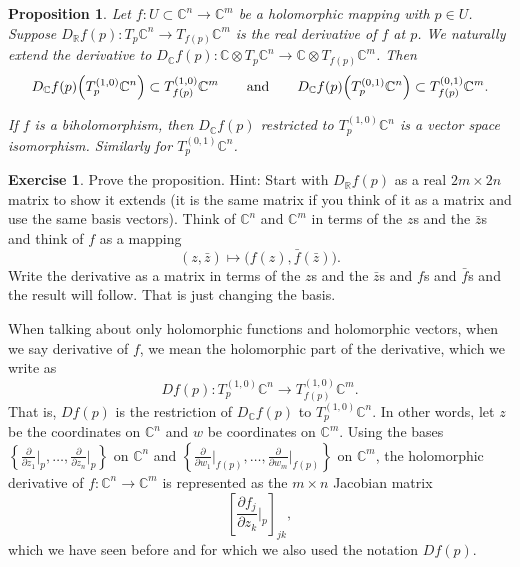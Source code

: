 \documentclass[12pt,openany]{book}
\newcommand{\C}{{\mathbb{C}}}
\newcommand{\R}{{\mathbb{R}}}
\theoremstyle{plain}
\newtheorem{prop}[thm]{Proposition}
\theoremstyle{remark}
\theoremstyle{definition}
\newenvironment{exbox}{%
    \def\FrameCommand{\vrule width 1pt \relax\hspace {10pt}}%
    \MakeFramed {\advance \hsize -\width \FrameRestore }%
}{%
    \endMakeFramed
}
\theoremstyle{exercise}
\newtheorem{exercise}{Exercise}[section]
\theoremstyle{example}
\begin{document}
\begin{prop} \label{prop:holvectmap}
Let $f \colon U \subset \C^n \to \C^m$ be a holomorphic mapping with
$p \in U$.
Suppose 
$D_\R f(p) \colon T_p\C^n \to T_{f(p)} \C^m$
is the real derivative of $f$ at $p$.
%
We naturally
extend the derivative to $D_\C f(p) \colon \C \otimes T_p\C^n \to \C \otimes  T_{f(p)}
\C^m$.  Then
\begin{equation*}
D_\C f(p)\Bigl(T_p^{(1,0)} \C^n\Bigr) \subset T_{f(p)}^{(1,0)} \C^m
\qquad \text{and} \qquad
D_\C f(p)\Bigl(T_p^{(0,1)} \C^n\Bigr) \subset T_{f(p)}^{(0,1)} \C^m .
\end{equation*}

If $f$ is a biholomorphism, then $D_\C f(p)$ restricted to $T_p^{(1,0)} \C^n$
is a vector space isomorphism.  Similarly for $T_p^{(0,1)} \C^n$.
\end{prop}

\begin{exbox}
\begin{exercise}
Prove the proposition.
Hint: Start with $D_\R f(p)$ as a real $2m \times 2n$ matrix to show it
extends (it is the same matrix if you think of it as a matrix
and use the same basis vectors).
Think of $\C^n$ and $\C^m$ in terms of the $z$s and the
$\bar{z}$s and think of $f$ as a mapping
\begin{equation*}
(z,\bar{z}) \mapsto \bigl( f(z) , \bar{f}(\bar{z}) \bigr) .
\end{equation*}
Write the derivative as a matrix in terms of the $z$s and the $\bar{z}$s
and $f$s and $\bar{f}$s and the result will follow.  That is just changing
the basis.
\end{exercise}
\end{exbox}

When talking about only holomorphic functions and holomorphic vectors,
when we say derivative of $f$, we mean the holomorphic part of the
derivative, which we write as
%
\begin{equation*}
D f(p) \colon T_p^{(1,0)} \C^n \to T_{f(p)}^{(1,0)} \C^m .
\end{equation*}
That is, $Df(p)$ is the restriction of $D_\C f(p)$ to $T_p^{(1,0)} \C^n$.
In other words, let $z$ be the coordinates on $\C^n$ and
$w$ be coordinates on $\C^m$.
Using the bases
$\left\{ \frac{\partial}{\partial z_1} \big|_p,\ldots,
\frac{\partial}{\partial z_n} \big|_p \right\}$
on $\C^n$ and 
$\left\{ \frac{\partial}{\partial w_1} \big|_{f(p)},\ldots,
\frac{\partial}{\partial w_m} \big|_{f(p)} \right\}$ on $\C^m$,
the holomorphic derivative of $f \colon \C^{n} \to \C^m$ is represented
as the $m \times n$ Jacobian matrix
\begin{equation*}
\left[
\frac{\partial f_j}{\partial z_k} \Big|_p
\right]_{jk} ,
\end{equation*}
which we have seen before and for which we also used the notation 
$Df(p)$.
\end{document}
